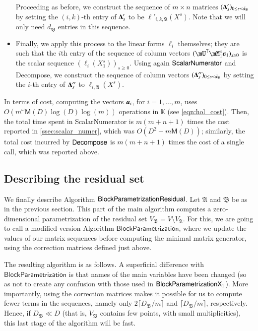 \documentclass[final,1p,times,authoryear]{elsarticle}
\newcommand{\mat}[1]{\bm{\MakeUppercase{#1}}} %
\newcommand{\row}[1]{\bm{\MakeLowercase{#1}}} %
\newcommand{\col}[1]{\bm{\MakeLowercase{#1}}} %
\newcommand{\mainalgoname}{\mathsf{ BlockParametrization}}
\newcommand{\lf}{X}
\newcommand{\trsp}[1]{#1^{\mathsf{T}}} %
\def\M {\ensuremath{\mathsf{M}}}
\def\K{\mathbb{K}}
\def\K {\ensuremath{\mathbb{K}}}
\newcommand{\mUt}{\trsp{\mU}}
\begin{document}
\begin{itemize}
    \smallskip

    Proceeding as before, we construct the sequence of $m \times n$ matrices
    $(\mat{\Delta}'_s)_{0 \le s < d_\mathfrak{B}}$ by setting the
    $(i,k)$-th entry of $\mat{\Delta}'_s$ to be
    $\ell'_{i,k,\mathfrak{A}}(\lf^s)$. Note that we will only need $d_\mathfrak{B}$
    entries in this sequence.

    \smallskip

  \item Finally, we apply this process to the linear forms $\ell_i$
    themselves; they are such that the $i$th entry of the sequence of
    column vectors $(\mUt \mM_1^s \col{\varepsilon}_1)_{s \ge0}$ is
    the scalar sequence $(\ell_{i}(X_1^s))_{s \ge 0}$. Using again
    $\mathsf{{\sf ScalarNumerator}}$ and {\sf Decompose}, we construct
    the sequence of column vectors $(\mat{\Delta}''_s)_{0 \le s <
    d_\mathfrak{B}}$ by setting the $i$-th entry of $\mat{\Delta}''_s$
    to $\ell_{i,\mathfrak{A}}(\lf^s)$.
\end{itemize}

In terms of cost, computing the vectors $\row{a}_i$, for
$i=1,\dots,m$, uses $O(m^{\omega} \M(D) \log(D) \log(m))$ operations in $\K$
(see \cref{eqn:hol_cost}).  Then, the total time
spent in {\sf ScalarNumerator} is $m(m+n+1)$ times the cost reported in
\cref{ssec:scalar_numer}, which was $O(D^2 + m\M(D))$; similarly, the total
cost incurred by ${\sf Decompose}$ is $m(m+n+1)$ times the cost of a single
call, which was reported above.


\subsection{Describing the residual set}

We finally describe Algorithm $\mainalgoname{\sf Residual}$.  Let
$\mathfrak{A}$ and $\mathfrak{B}$ be as in the previous section.  This
part of the main algorithm computes a zero-dimensional parametrization
of the residual set $V_\mathfrak{B}=V\setminus V_\mathfrak{A}$. For this, we
are going to call a modified version Algorithm
$\mathsf{BlockParametrization}$, where we update the values of our
matrix sequences before computing the minimal matrix generator, using
the correction matrices defined just above.

The resulting algorithm is as follows. A superficial difference with
$\mathsf{BlockParametrization}$ is that names of the main variables
have been changed (so as not to create any confusion with those used
in $\mainalgoname{\sf X}_1$). More importantly, using the correction
matrices makes it possible for us to compute fewer terms in the
sequences, namely only $2\lceil D_\mathfrak{B}/m\rceil$ and
$\lceil D_\mathfrak{B}/m\rceil$, respectively. Hence, if $D_\mathfrak{B} \ll D$
(that is, $V_\mathfrak{B}$ contains few points, with small
multiplicities), this last stage of the algorithm will be fast.
\end{document}
